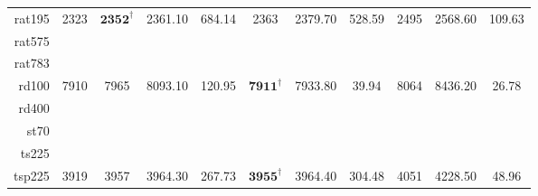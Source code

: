 \documentclass[12pt]{ctexart}
\begin{document}
\begin{table}[htbp]
\begin{tabular}{rcccccccccc}
        rat195                        & 2323                              & $\textbf{2352}^\dag$        & 2361.10                                & 684.14           & 2363                    & 2379.70          & 528.59           & 2495                  & 2568.60          & 109.63           \\
        rat575                                                                                                                                                                                                                                                                                    \\
        rat783                                                                                                                                                                                                                                                                                    \\
        rd100                         & 7910                              & 7965                        & 8093.10                                & 120.95           & $\textbf{7911}^\dag$    & 7933.80          & 39.94            & 8064                  & 8436.20          & 26.78            \\
        rd400                                                                                                                                                                                                                                                                                     \\
        st70                                                                                                                                                                                                                                                                                      \\
        ts225                                                                                                                                                                                                                                                                                     \\
        tsp225                        & 3919                              & 3957                        & 3964.30                                & 267.73           & $\textbf{3955}^\dag$    & 3964.40          & 304.48           & 4051                  & 4228.50          & 48.96            \\

\end{tabular}
\end{table}
\end{document}
